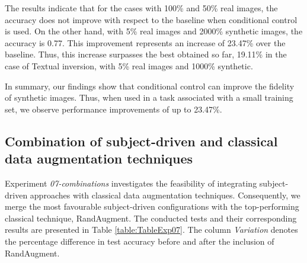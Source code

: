 The results indicate that for the cases with 100\% and 50\% real images, the accuracy does not improve with respect to the baseline when conditional control is used. On the other hand, with 5\% real images and 2000\% synthetic images, the accuracy is 0.77. This improvement represents an increase of 23.47\% over the baseline. Thus, this increase surpasses the best obtained so far, 19.11\% in the case of Textual inversion, with 5\% real images and 1000\% synthetic.

In summary, our findings show that conditional control can improve the fidelity of synthetic images. Thus, when used in a task associated with a small training set, we observe performance improvements of up to 23.47\%.

\subsection{Combination of subject-driven and classical data augmentation techniques} \label{sec: exp-07}

Experiment \textit{07-combinations} investigates the feasibility of integrating subject-driven approaches with classical data augmentation techniques. Consequently, we merge the most favourable subject-driven configurations with the top-performing classical technique, RandAugment. The conducted tests and their corresponding results are presented in Table \ref{table:TableExp07}. The column \textit{Variation} denotes the percentage difference in test accuracy before and after the inclusion of RandAugment.

